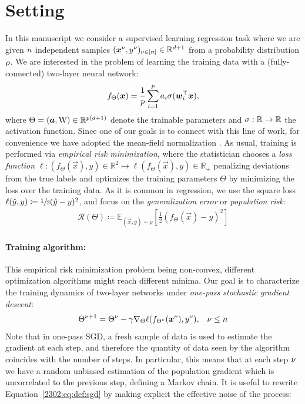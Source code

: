 \section{Setting}

\label{2302:sec:setting}
In this manuscript we consider a supervised learning regression task where we are given $n$ independent samples $({\boldsymbol{x}}^{\nu},y^{\nu})_{\nu\in [n]}\in\mathbb{R}^{d+1}$ from a probability distribution $\rho$. We are interested in the problem of learning the training data with a (fully-connected) two-layer neural network:
\begin{align}
\label{2302:eq:def:model}
f_{\Theta}({\boldsymbol{x}}) = \frac{1}{p}\sum\limits_{i=1}^{p}a_{i}\sigma({\boldsymbol{w}}_{i}^{\top}{\boldsymbol{x}}),
\end{align}
 where $\Theta = ({\boldsymbol{a}},\mathrm{W})\in\mathbb{R}^{p(d+1)}$ denote the trainable parameters and $\sigma:\mathbb{R}\to\mathbb{R}$ the activation function. Since one of our goals is to connect with this line of work, for convenience we have adopted the mean-field normalization \citep{mei2018mean,chizat2018global,rotskoff2022trainability,sirignano2020mean}. As usual, training is performed via \emph{empirical risk minimization}, where the statistician chooses a \emph{loss function} $\ell:(f_{\Theta}(\vec{x}), y)\in\mathbb{R}^{2}\mapsto \ell(f_{\Theta}(\vec{x}), y)\in\mathbb{R}_{+}$ penalizing deviations from the true labels and optimizes the training parameters $\Theta$ by minimizing the loss over the training data. As it is common in regression, we use the square loss $\ell(\hat{y},y) \coloneqq \sfrac{1}{2}(\hat{y}-y)^2$, and focus on the \emph{generalization error} or \emph{population risk}:
\begin{align}
\label{2302:eq:def:poprisk}
\mathcal{R}(\Theta) \coloneqq \mathbb{E}_{(\vec{x},y)\sim\rho}\left[\frac{1}{2}(f_{\Theta}(\vec{x})-y)^2\right]
\end{align}

\paragraph{Training algorithm:} This empirical risk minimization problem being non-convex, different optimization algorithms might reach different minima. Our goal is to characterize the training dynamics of two-layer networks under \emph{one-pass stochastic gradient descent}:
\begin{align}
\label{2302:eq:def:sgd}
\Theta^{\nu+1} = \Theta^{\nu} -\gamma\nabla_{\Theta}\ell(f_{\Theta^{\nu}}({\boldsymbol{x}}^{\nu}),y^{\nu}), && \nu \leq n
\end{align}
Note that in one-pass SGD, a fresh sample of data is used to estimate the gradient at each step, and therefore the quantity of data seen by the algorithm coincides with the number of steps. In particular, this means that at each step $\nu$ we have a random unbiased estimation of the population gradient which is uncorrelated to the previous step, defining a Markov chain. It is useful to rewrite Equation~\eqref{2302:eq:def:sgd} by making explicit the effective noise of the process:

